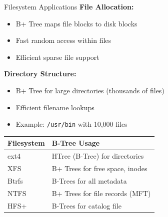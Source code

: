 \documentclass[aspectratio=169]{beamer}
\begin{document}
\begin{frame}{Filesystem Applications}
  \textbf{File Allocation:}
  \begin{itemize}
    \item B+ Tree maps file blocks to disk blocks
    \item Fast random access within files
    \item Efficient sparse file support
  \end{itemize}

  \vspace{0.3cm}
  \textbf{Directory Structure:}
  \begin{itemize}
    \item B+ Tree for large directories (thousands of files)
    \item Efficient filename lookups
    \item Example: \texttt{/usr/bin} with 10,000 files
  \end{itemize}

  \vspace{0.3cm}
  \begin{center}
  \begin{tabular}{|l|l|}
    \hline
    \textbf{Filesystem} & \textbf{B-Tree Usage} \\
    \hline
    ext4 & HTree (B-Tree) for directories \\
    \hline
    XFS & B+ Trees for free space, inodes \\
    \hline
    Btrfs & B-Trees for all metadata \\
    \hline
    NTFS & B+ Trees for file records (MFT) \\
    \hline
    HFS+ & B-Trees for catalog file \\
    \hline
  \end{tabular}
  \end{center}
\end{frame}
\end{document}
